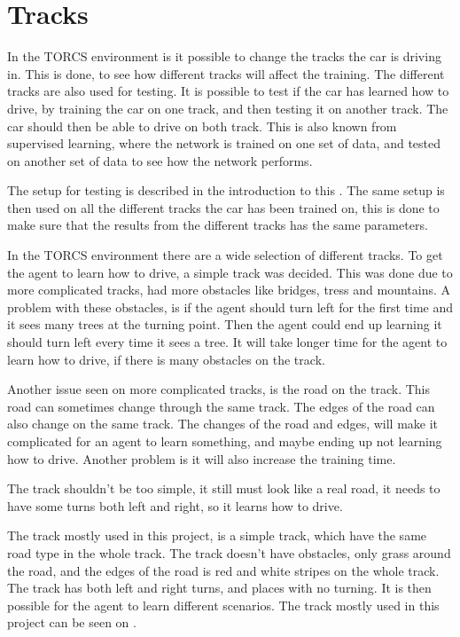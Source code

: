 \section{Tracks}\label{Tracks}
In the TORCS environment is it possible to change the tracks the car is driving in. This is done, to see how different tracks will affect the training. The different tracks are also used for testing. It is possible to test if the car has learned how to drive, by training the car on one track, and then testing it on another track. The car should then be able to drive on both track. This is also known from supervised learning, where the network is trained on one set of data, and tested on another set of data to see how the network performs.   

The setup for testing is described in the introduction to this . The same setup is then used on all the different tracks the car has been trained on, this is done to make sure that the results from the different tracks has the same parameters.  

In the TORCS environment there are a wide selection of different tracks. To get the agent to learn how to drive, a simple track was decided. This was done due to more complicated tracks, had more obstacles like bridges, tress and mountains. A problem with these obstacles, is if the agent should turn left for the first time and it sees many trees at the turning point. Then the agent could end up learning it should turn left every time it sees a tree. It will take longer time for the agent to learn how to drive, if there is many obstacles on the track.   

Another issue seen on more complicated tracks, is the road on the track. This road can sometimes change through the same track. The edges of the road can also change on the same track. The changes of the road and edges, will make it complicated for an agent to learn something, and maybe ending up not learning how to drive. Another problem is it will also increase the training time. 

The track shouldn't be too simple, it still must look like a real road, it needs to have some turns both left and right, so it learns how to drive. 

The track mostly used in this project, is a simple track, which have the same road type in the whole track. The track doesn't have obstacles, only grass around the road, and the edges of the road is red and white stripes on the whole track. The track has both left and right turns, and places with no turning. It is then possible for the agent to learn different scenarios. The track mostly used in this project can be seen on .

